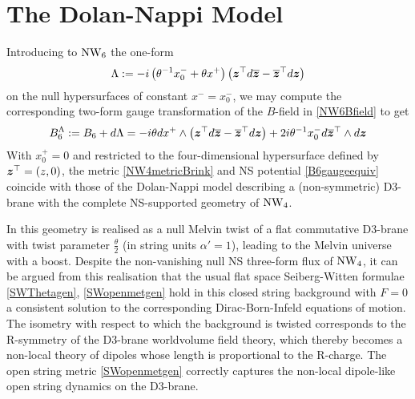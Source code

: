 \section{The Dolan-Nappi Model}
\label{DNModel}
Introducing to $\operatorname{NW}_6$ the one-form
\begin{equation}
  \label{Lambdadef}
  \Lambda:=- i\left(\theta^{-1} x_0^-+\theta x^+\right)
  \left({{\boldsymbol {z} }}^\top  d\overline{{{\boldsymbol {z} }}}-\overline{{{\boldsymbol {z} }}}^{\top}d{{\boldsymbol {z} }}\right)
\end{equation}
on the null hypersurfaces of constant $x^-=x_0^-$, we may compute the
corresponding two-form gauge transformation of the $B$-field in
\eqref{NW6Bfield} to get
\begin{equation}
  \label{B6gaugeequiv}
  B_6^\Lambda:=B_6+ d\Lambda=- i\theta  d x^+\wedge\left(
    {{\boldsymbol {z} }}^\top  d\overline{{{\boldsymbol {z} }}}-\overline{{{\boldsymbol {z} }}}{}^{ \top}  d{{\boldsymbol {z} }}
  \right)+2 i\theta^{-1} x_0^-  d\overline{{{\boldsymbol {z} }}}{}^{ \top}
  \wedge d{{\boldsymbol {z} }}
\end{equation}
With $x_0^+=0$ and restricted to the four-dimensional hypersurface defined by
${{\boldsymbol {z} }}^\top=(z,0)$, the metric \eqref{NW4metricBrink} and NS potential
\eqref{B6gaugeequiv} coincide with those of the Dolan-Nappi model \cite{DN1}
describing a (non-symmetric) D3-brane with the complete NS-supported geometry of
$\operatorname{NW}_4$.

In \cite{HT1} this geometry is realised as a null Melvin twist of a flat
commutative D3-brane with twist parameter $\frac\theta2$ (in string units
$\alpha'=1$), leading to the Melvin universe with a boost. Despite the
non-vanishing null NS three-form flux of $\operatorname{NW}_4$, it can be argued from this
realisation that the usual flat space Seiberg-Witten formulae
\eqref{SWThetagen}, \eqref{SWopenmetgen} hold in this closed string background
with $F=0$ a consistent solution to the corresponding Dirac-Born-Infeld
equations of motion. The isometry with respect to which the background is
twisted corresponds to the R-symmetry of the D3-brane worldvolume field theory,
which thereby becomes a non-local theory of dipoles whose length is proportional
to the R-charge. The open string metric \eqref{SWopenmetgen} correctly captures
the non-local dipole-like open string dynamics on the D3-brane.

